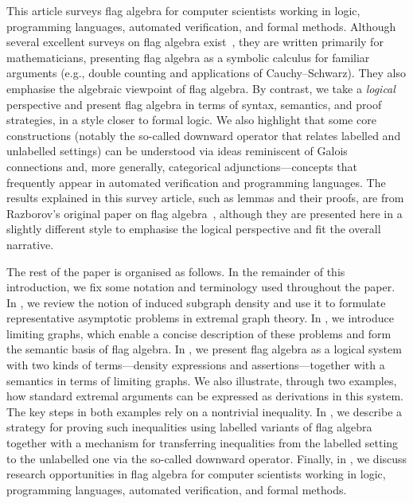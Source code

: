 \documentclass{article}
\begin{document}
This article surveys flag algebra for computer scientists working in logic, programming languages, automated verification, and formal
methods. Although several excellent surveys on flag algebra exist~\cite{Razborov13,SilvaFS16,Grzesik15thesis},
they are written primarily for mathematicians,
presenting flag algebra as a symbolic calculus for familiar arguments (e.g., double counting and
applications of Cauchy--Schwarz). They also emphasise the algebraic viewpoint of flag algebra. By contrast, we take a \emph{logical} perspective and present
flag algebra in terms of syntax, semantics, and proof strategies, in a style closer to formal
logic. We also highlight that some core constructions (notably the so-called downward operator that relates
labelled and unlabelled settings) can be understood via ideas reminiscent of Galois connections
and, more generally, categorical adjunctions---concepts that frequently appear in automated verification and programming languages. The results explained in this survey article, such as lemmas and their proofs, are from Razborov's original paper on flag algebra~\cite{Razborov2007}, although they are presented here in a slightly different style to emphasise the logical perspective and fit the overall narrative.

The rest of the paper is organised as follows. In the remainder of this introduction, we fix some notation and terminology used throughout the paper. In , we review the notion of induced subgraph density and use it to formulate representative asymptotic problems in extremal graph theory. In , we introduce limiting graphs, which enable a concise description of these problems and form the semantic basis of flag algebra. In , we present flag algebra as a logical system with two kinds of terms---density expressions and assertions---together with a semantics in terms of limiting graphs. We also illustrate, through two examples, how standard extremal arguments can be expressed as derivations in this system. The key steps in both examples rely on a nontrivial inequality. In , we describe a strategy for proving such inequalities using labelled variants of flag algebra together with a mechanism for transferring inequalities from the labelled setting to the unlabelled one via the so-called downward operator. Finally, in , we discuss research opportunities in flag algebra for computer scientists working in logic, programming languages, automated verification, and formal methods.
\end{document}
